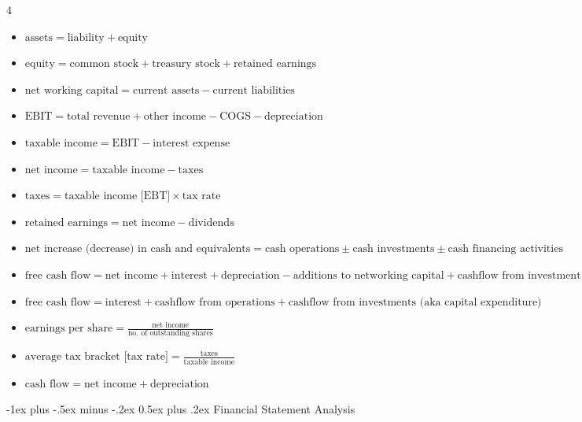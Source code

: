 \documentclass[10pt, landscape]{article}
\makeatletter
\renewcommand{\section}{\@startsection{section}{1}{0mm}%
  {-1ex plus -.5ex minus -.2ex}%
  {0.5ex plus .2ex}%
{\normalfont\large\bfseries}}
\makeatother
\begin{document}
\begin{multicols*}{4}
    \begin{itemize}
      \item $\text{assets} = \text{liability} + \text{equity}$
      \item $\text{equity} = \text{common stock} + \text{treasury stock} + \text{retained earnings}$
      \item $\text{net working capital} = \text{current assets} - \text{current liabilities}$
      \item $\text{EBIT} = \text{total revenue} + \text{other income} - \text{COGS} - \text{depreciation}$
      \item $\text{taxable income} = \text{EBIT} - \text{interest expense}$
      \item $\text{net income} = \text{taxable income} - \text{taxes}$
      \item $\text{taxes} = \text{taxable income [EBT]} \times \text{tax rate}$
      \item $\text{retained earnings} = \text{net income} - \text{dividends}$
      \item $\text{net increase (decrease) in cash and equivalents} = \text{cash operations} \pm \text{cash investments} \pm \text{cash financing activities}$
      \item $\text{free cash flow} = \text{net income} + \text{interest} + \text{depreciation} - \text{additions to networking capital} + \text{cashflow from investment}$
      \item $\text{free cash flow} = \text{interest} + \text{cashflow from operations} + \text{cashflow from investments (aka capital expenditure)}$
      \item $\text{earnings per share} = \frac{\text{net income}}{\text{no. of outstanding shares}}$
      \item $\text{average tax bracket [tax rate]} = \frac{\text{taxes}}{\text{taxable income}}$
      \item $\text{cash flow} = \text{net income} + \text{depreciation}$
    \end{itemize}

    \section{Financial Statement Analysis}


\end{multicols*}
\end{document}
